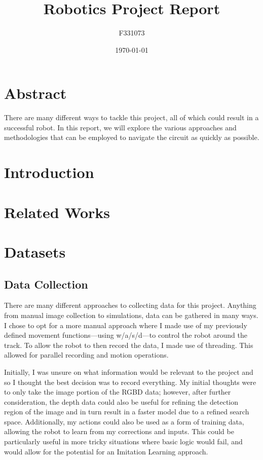 \documentclass[12pt]{article}
\title{Robotics Project Report}
\author{F331073}
\date{\today}
\begin{document}
\maketitle 

\tableofcontents 
\newpage

\section{Abstract}
There are many different ways to tackle this project, all of which could
result in a successful robot. In this report, we will explore the various
approaches and methodologies that can be employed to navigate the circuit
as quickly as possible.

\section{Introduction}

\section{Related Works} 

\section{Datasets}

\subsection{Data Collection} 
There are many different approaches to collecting data for this project. Anything from
manual image collection to simulations, data can be gathered in many ways.
I chose to opt for a more manual approach where I made use of my previously defined
movement functions---using w/a/s/d---to control the robot around the track. To allow
the robot to then record the data, I made use of threading. This allowed for parallel
recording and motion operations. 

Initially, I was unsure on what information would be relevant to the project and so I
thought the best decision was to record everything. My initial thoughts were to only
take the image portion of the RGBD data; however, after further consideration, the
depth data could also be useful for refining the detection region of the image and
in turn result in a faster model due to a refined search space.
Additionally, my actions could also be used as a form of training data, allowing the
robot to learn from my corrections and inputs. This could be particularly useful in more
tricky situations where basic logic would fail, and would allow for the potential for an
Imitation Learning approach.
\end{document}
